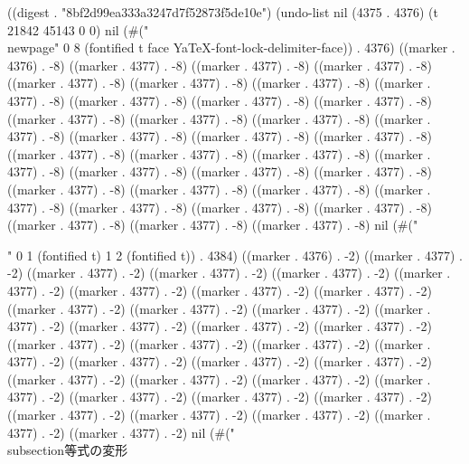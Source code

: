 
((digest . "8bf2d99ea333a3247d7f52873f5de10e") (undo-list nil (4375 . 4376) (t 21842 45143 0 0) nil (#("\\newpage" 0 8 (fontified t face YaTeX-font-lock-delimiter-face)) . 4376) ((marker . 4376) . -8) ((marker . 4377) . -8) ((marker . 4377) . -8) ((marker . 4377) . -8) ((marker . 4377) . -8) ((marker . 4377) . -8) ((marker . 4377) . -8) ((marker . 4377) . -8) ((marker . 4377) . -8) ((marker . 4377) . -8) ((marker . 4377) . -8) ((marker . 4377) . -8) ((marker . 4377) . -8) ((marker . 4377) . -8) ((marker . 4377) . -8) ((marker . 4377) . -8) ((marker . 4377) . -8) ((marker . 4377) . -8) ((marker . 4377) . -8) ((marker . 4377) . -8) ((marker . 4377) . -8) ((marker . 4377) . -8) ((marker . 4377) . -8) ((marker . 4377) . -8) ((marker . 4377) . -8) ((marker . 4377) . -8) ((marker . 4377) . -8) ((marker . 4377) . -8) ((marker . 4377) . -8) ((marker . 4377) . -8) ((marker . 4377) . -8) ((marker . 4377) . -8) ((marker . 4377) . -8) ((marker . 4377) . -8) ((marker . 4377) . -8) nil (#("

" 0 1 (fontified t) 1 2 (fontified t)) . 4384) ((marker . 4376) . -2) ((marker . 4377) . -2) ((marker . 4377) . -2) ((marker . 4377) . -2) ((marker . 4377) . -2) ((marker . 4377) . -2) ((marker . 4377) . -2) ((marker . 4377) . -2) ((marker . 4377) . -2) ((marker . 4377) . -2) ((marker . 4377) . -2) ((marker . 4377) . -2) ((marker . 4377) . -2) ((marker . 4377) . -2) ((marker . 4377) . -2) ((marker . 4377) . -2) ((marker . 4377) . -2) ((marker . 4377) . -2) ((marker . 4377) . -2) ((marker . 4377) . -2) ((marker . 4377) . -2) ((marker . 4377) . -2) ((marker . 4377) . -2) ((marker . 4377) . -2) ((marker . 4377) . -2) ((marker . 4377) . -2) ((marker . 4377) . -2) ((marker . 4377) . -2) ((marker . 4377) . -2) ((marker . 4377) . -2) ((marker . 4377) . -2) ((marker . 4377) . -2) ((marker . 4377) . -2) ((marker . 4377) . -2) ((marker . 4377) . -2) nil (#("\\subsection{等式の変形}

